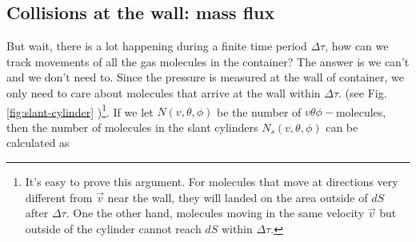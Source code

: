 \subsection{Collisions at the wall: mass flux}
 But wait, there is a lot happening during a finite time period $ \Delta\tau $, how can we track movements of all the gas molecules in the container? The answer is we can't and we don't need to. Since the pressure is measured at the wall of container, we only need to care about molecules that arrive at the wall within $ \Delta\tau $.  (see Fig.\ref{fig:slant-cylinder} )\footnote{It's easy to prove this  argument. For molecules that move at directions very different from $ \vec{v} $ near the wall, they will landed on the area outside of $dS$ after $ \Delta\tau $. One the other hand, molecules moving in the same velocity $ \vec{v} $ but outside of the cylinder cannot reach $ dS $ within $ \Delta\tau $. }. If we let $ N(v,\theta,\phi) $ be the number of $ v\theta\phi-$molecules, then the number of molecules in the slant cylinders $ N_s(v,\theta,\phi) $ can be calculated as 
